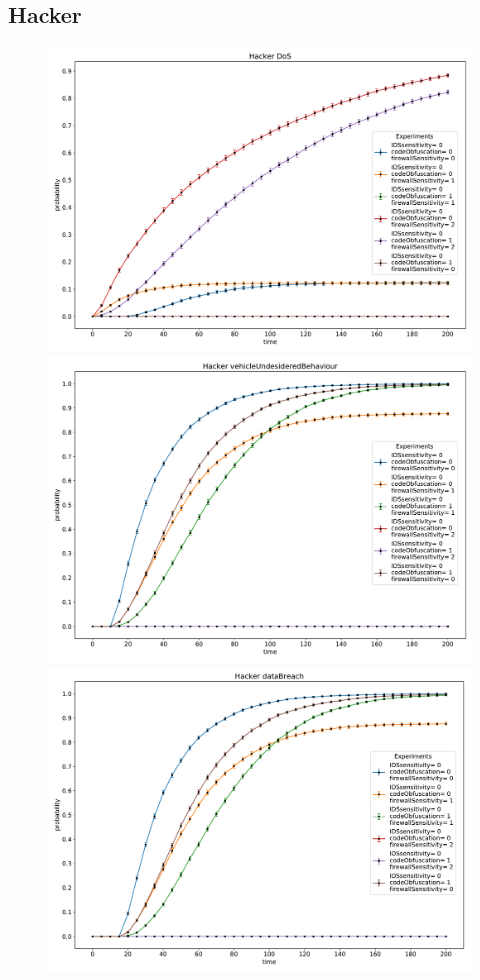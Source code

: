 \subsection*{Hacker}
\begin{figure}[H]
    \begin{center}
        \includegraphics[scale=0.3]{img/Hacker_DoS.pdf}
        \includegraphics[scale=0.3]{img/Hacker_vOB.pdf}
        \includegraphics[scale=0.3]{img/Hacker_dataBreach.pdf}

\end{center}
\end{figure}
